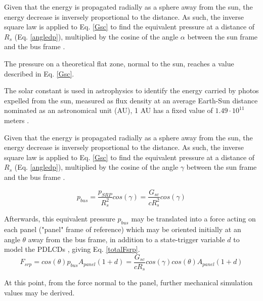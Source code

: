 Given that the energy is propagated radially as a sphere away from the sun, the energy decrease is inversely proportional to the distance. As such, the inverse square law is applied to Eq. \ref{Gsc} to find the equivalent pressure at a distance of $R_s$ (Eq. \ref{angledp}), multiplied by the cosine of the angle $\alpha$ between the sun frame and the bus frame \protect\cite{sundyn}.

The pressure on a theoretical flat zone, normal to the sun, reaches a value described in Eq. \ref{Gsc}.

The solar constant is used in astrophysics to identify the
energy carried by photos expelled from the sun, measured as
flux density at an average Earth-Sun distance nominated as an
astronomical unit (AU), 1 AU has a fixed value of $1.49\cdot10^{11}$ meters \cite{Astro}.

Given that the energy is propagated radially as a sphere away from the sun, the energy decrease is inversely proportional to the distance. As such, the inverse square law is applied to Eq. \ref{Gsc} to find the equivalent pressure at a distance of $R_s$ (Eq. \ref{angledp}), multiplied by the cosine of the angle $\gamma$ between the sun frame and the bus frame \protect\cite{sundyn}.

\begin{equation}
p_{bus} = \frac{p_{SRP}}{R_s^2} cos(\gamma) = \frac{G_{sc}}{c R_s^2} cos(\gamma)
\label{angledp}
\end{equation}

Afterwards, this equivalent pressure $p_{bus}$ may be translated into a force acting on each panel ("panel" frame of reference) which may be oriented initially at an angle $\theta$ away from the bus frame, in addition to a state-trigger variable $d$ to model the PDLCDs \protect\cite{attitudeAndres}, giving Eq. \ref{totalFsrp}.
\begin{equation}
F_{srp} = cos(\theta)p_{bus}A_{panel}(1+d) = \frac{G_{sc}}{c R_s} cos(\gamma)cos(\theta)A_{panel}(1+d)
\label{totalFsrp}
\end{equation}

At this point, from the force normal to the panel, further mechanical simulation values may be derived.


